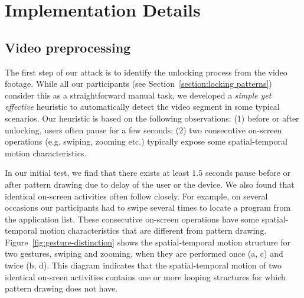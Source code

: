 \vspace{-2mm}
\section{Implementation Details}

\subsection{Video preprocessing \label{sec:identify}}
\label{section:recognition}
The first step of our attack is to identify the unlocking process from the
video footage. While all our
participants (see Section~\ref{section:locking patterns}) consider this as a straightforward manual task, we developed a \emph{simple yet effective} heuristic to automatically detect the video segment in some typical scenarios. Our heuristic is based on the following observations: (1) before or after
unlocking, users often pause for a few seconds; (2) two consecutive on-screen operations (e.g. swiping, zooming etc.) typically expose some spatial-temporal motion characteristics.

In our initial test, we find that there exists at least $1.5$ seconds pause before or after pattern drawing due to delay of the user or the device. We also found that identical on-screen activities often follow closely. For example, on several occasions our participants had to swipe several times  to locate a program from the application list.
These consecutive on-screen operations have some spatial-temporal motion characteristics that are different from pattern drawing.
Figure~\ref{fig:gesture-distinction} shows the spatial-temporal motion structure for  two gestures, swiping and zooming, when they are performed once (a, c) and twice (b, d).
This diagram indicates that the spatial-temporal motion of two identical on-sreen activities contains one or more looping structures for which pattern drawing does not have.

